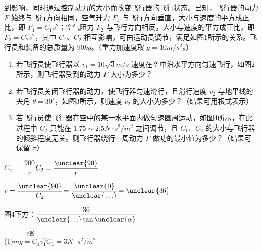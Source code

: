 \begin{problem}
到影响，同时通过控制动力的大小而改变飞行器的飞行状态。已知，飞行器的动力 $F$ 始终与飞行方向相同，空气升力 $F_1$ 与飞行方向垂直，大小与速度的平方成正比，即 $F_1=C_1v^2$；空气阻力 $F_2$ 与飞行方向相反，大小与速度的平方成正比，即 $F_2=C_2v^2$，其中 $C_1$、$C_2$ 相互影响，可由运动员调节，满足如图1所示的关系。飞行员和装备的总质量为 $90\unit{kg}$。（重力加速度取 $g=10\unit{m/s^2}$。）
\begin{enumerate}[label=（\arabic*）]
\item 若飞行员使飞行器以 $v_1=10\sqrt{3}\unit{m/s}$ 速度在空中沿水平方向匀速飞行，如图2所示，则飞行器受到的动力 $F$ 大小为多少？
\item 若飞行员关闭飞行器的动力，使飞行器匀速滑行，且滑行速度 $v_2$ 与地平线的夹角 $\theta=30^\circ$，如图3所示，则速度 $v_2$ 的大小为多少？（结果可用根式表示）
\item 若飞行员使飞行器在空中的某一水平面内做匀速圆周运动，如图4所示，在此过程中 $C_2$ 只能在 $1.75\sim2.5\unit{N\cdot s^2/m^2}$ 之间调节，且 $C_1$、$C_2$ 的大小与飞行器的倾斜程度无关。则飞行器绕行一周动力 $F$ 做功的最小值为多少？（结果可保留 $\pi$）
\end{enumerate}
\quad{} %
\par $C_2$\,$\,=\dfrac{900}{r}$\quad{}\quad $C_2=\dfrac{\unclear{90}}{r}$
\par $r=\dfrac{\unclear{90}}{C_2}$\quad $=\dfrac{\unclear{0}}{\unclear{\ldots}}$\quad $=\unclear{36}$
\par 图4下方：$\dfrac{36}{\unclear{\ldots}\tan\unclear{\alpha}}$
\begin{solution}
(1)\quad $\overset{\text{平衡}}{mg=C_1v_1^2}$\quad $C_1=3\unit{N\cdot s^2/m^2}$

\end{solution}
\end{problem}
